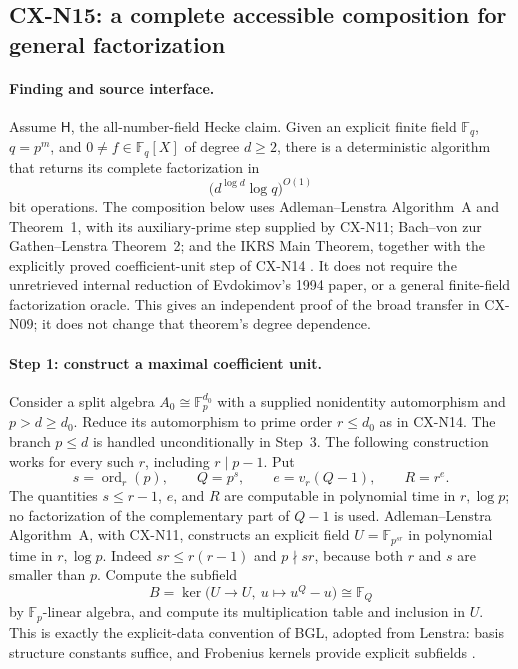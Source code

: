 \subsection{CX-N15: a complete accessible composition for general factorization}
\label{finding:CX-N15}

\paragraph{Finding and source interface.}
Assume \(\mathsf H\), the all-number-field Hecke claim.
Given an explicit finite field \(\mathbb F_q\), \(q=p^m\), and
\(0\ne f\in\mathbb F_q[X]\) of degree \(d\geq2\), there is a
deterministic algorithm that returns its complete factorization in
\[
 \bigl(d^{\log d}\log q\bigr)^{O(1)}
\]
bit operations.
The composition below uses Adleman--Lenstra Algorithm~A and
Theorem~1, with its auxiliary-prime step supplied by CX-N11;
Bach--von zur Gathen--Lenstra Theorem~2; and the IKRS Main Theorem,
together with the explicitly proved coefficient-unit step of
CX-N14
\cite{CXNAdlemanLenstra86,CXNBGL01,CXNIKRS08}.
It does not require the unretrieved internal reduction of
Evdokimov's 1994 paper, or a general finite-field factorization
oracle.
This gives an independent proof of the broad transfer in CX-N09;
it does not change that theorem's degree dependence.

\paragraph{Step 1: construct a maximal coefficient unit.}
Consider a split algebra \(A_0\cong\mathbb F_p^{d_0}\) with a
supplied nonidentity automorphism and \(p>d\geq d_0\).
Reduce its automorphism to prime order \(r\leq d_0\) as in
CX-N14. The branch \(p\leq d\) is handled unconditionally in
Step~3. The following construction works for every such \(r\),
including \(r\mid p-1\). Put
\[
 s=\operatorname{ord}_r(p),\qquad Q=p^s,
 \qquad e=v_r(Q-1),\qquad R=r^e.
\]
The quantities \(s\leq r-1\), \(e\), and \(R\) are computable
in polynomial time in \(r,\log p\); no factorization of the
complementary part of \(Q-1\) is used.
Adleman--Lenstra Algorithm~A, with CX-N11, constructs an explicit
field
\(U=\mathbb F_{p^{sr}}\) in polynomial time in \(r,\log p\).
Indeed \(sr\leq r(r-1)\) and \(p\nmid sr\), because both
\(r\) and \(s\) are smaller than \(p\).
Compute the subfield
\[
 B=\ker\bigl(U\longrightarrow U,\ u\longmapsto u^Q-u\bigr)
   \cong\mathbb F_Q
\]
by \(\mathbb F_p\)-linear algebra, and compute its multiplication
table and inclusion in \(U\).
This is exactly the explicit-data convention of BGL, adopted
from Lenstra: basis structure constants suffice, and Frobenius
kernels provide explicit subfields
\cite[p.~329 and \S2, p.~332]{CXNLenstra91}.

